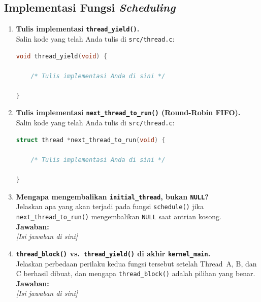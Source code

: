 \subsection{Implementasi Fungsi \textit{Scheduling}}

\begin{enumerate}

    \item \textbf{Tulis implementasi \texttt{thread\_yield()}.}\\
    Salin kode yang telah Anda tulis di \texttt{src/thread.c}:

    \begin{lstlisting}[language=c, caption={Implementasi \texttt{thread\_yield()} oleh mahasiswa}]
void thread_yield(void) {

    /* Tulis implementasi Anda di sini */

}
    \end{lstlisting}

    \item \textbf{Tulis implementasi \texttt{next\_thread\_to\_run()}
    (Round-Robin FIFO).}\\
    Salin kode yang telah Anda tulis di \texttt{src/thread.c}:

    \begin{lstlisting}[language=c, caption={Implementasi \texttt{next\_thread\_to\_run()} oleh mahasiswa}]
struct thread *next_thread_to_run(void) {

    /* Tulis implementasi Anda di sini */

}
    \end{lstlisting}

    \item \textbf{Mengapa mengembalikan \texttt{initial\_thread},
    bukan \texttt{NULL}?}\\
    Jelaskan apa yang akan terjadi pada fungsi \texttt{schedule()} jika
    \texttt{next\_thread\_to\_run()} mengembalikan \texttt{NULL} saat
    antrian kosong.\\[0.3cm]
    \textbf{Jawaban:}\\
    \textit{[Isi jawaban di sini]}

    \item \textbf{\texttt{thread\_block()} vs.\ \texttt{thread\_yield()}
    di akhir \texttt{kernel\_main}.}\\
    Jelaskan perbedaan perilaku kedua fungsi tersebut setelah Thread~A,
    B, dan C berhasil dibuat, dan mengapa \texttt{thread\_block()}
    adalah pilihan yang benar.\\[0.3cm]
    \textbf{Jawaban:}\\
    \textit{[Isi jawaban di sini]}

\end{enumerate}

